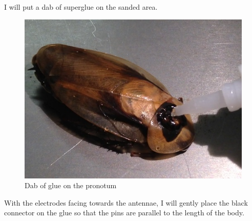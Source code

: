 I will put a dab of superglue on the sanded area. 
{\begin{figure}[ht!]
\centering
\includegraphics[scale=0.25]{Surgery Photos/gluepronotum.jpg}
\caption{Dab of glue on the pronotum}
\label{fig:gluepronotum}
\end{figure}}
With the electrodes facing towards the antennae, I will gently place the black connector on the glue so that the pins are parallel to the length of the body. 
